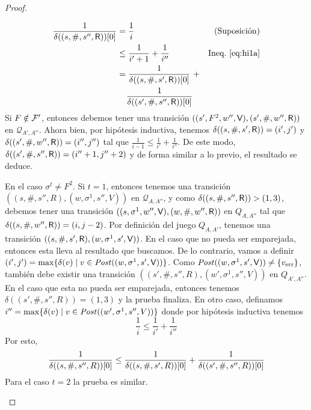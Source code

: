 \begin{proof}
\begin{description}
\begin{align*}
	\frac{1}{\pr{0}{\delta((s,\#, s'', \Refuter))}} & = \frac{1}{i} & \text{(Suposición)} \\
									      & \leq \frac{1}{i'+1} + \frac{1}{i''} & \text{Ineq.~\ref{eq:hi1a}} \\
									      &  = \frac{1}{\pr{0}{\delta((s, \#, s', \Refuter))}} \ +  \\ &\phantom{=\ } \frac{1}{\pr{0}{\delta((s', \#, s'', \Refuter))}} &
\end{align*}
	Si $F \notin \Faults'$, entonces debemos tener una transición $((s', F^2, w'', \Verifier), (s', \#, w'', \Refuter))$ en $\mathcal{Q}_{A',A''}$. 
Ahora bien, por hipótesis inductiva, tenemos $\delta((s, \#, s', \Refuter)) = (i',j')$ y $\delta((s', \#, w'', \Refuter)) = (i'',j'')$ tal que 
$\frac{1}{i-1} \leq \frac{1}{i'} + \frac{1}{i''}$. De este modo, $\delta((s', \#, s'', \Refuter)) = (i''+1, j''+2)$ y de forma similar a lo previo, el resultado se deduce.

	En el caso $\sigma^t \neq F^2$. Si $t=1$, entonces tenemos una transición $((s, \#, s'', R), (w, \sigma^1, s'', V))$ en $\mathcal{Q}_{A,A''}$, y 
	como $\delta((s, \#, s'', \Refuter)) > (1,3)$,
debemos tener una transición $((s, \sigma^1, w'', \Verifier), (w, \#, w'', \Refuter))$ en $Q_{A,A''}$ tal que $\delta((s, \#, w'', \Refuter)) = (i,j-2)$. 
Por definición del juego $Q_{A, A'}$, tenemos una transición
$((s, \#, s', \Refuter), (w, \sigma^1, s', \Verifier))$. En el caso que no pueda ser emparejada, entonces esta lleva al resultado que buscamos. De lo contrario, vamos a definir $(i',j') = \max \{\delta(v) \mid v \in \post((w, \sigma^1, s', \Verifier)) \}$. 
Como $\post((w, \sigma^1, s', \Verifier)) \neq \{\ErrorSt\}$, también debe existir una transición $((s', \#, s'', R), (w', \sigma^1, s'', V))$ en $Q_{A',A''}$. 
En el caso que esta no pueda ser emparejada, entonces tenemos $\delta((s', \#, s'', R)) = (1,3)$ y la prueba finaliza. 
En otro caso, definamos $i'' = \max \{\delta(v) \mid v \in \post((w', \sigma^1, s'', V)) \}$ donde por hipótesis inductiva tenemos
\begin{equation}
	\frac{1}{i} \leq \frac{1}{i'} + \frac{1}{i''}
\end{equation}	
	Por esto, 
\begin{equation}
	\frac{1}{\pr{0}{\delta((s, \#, s'', R))}} \leq \frac{1}{\pr{0}{\delta((s, \#, s', R))}} + \frac{1}{\pr{0}{\delta((s', \#, s'', R))}}
\end{equation}	
	Para el caso $t=2$ la prueba es similar.
\end{description}


\qedhere
\end{proof}\\
\fi

